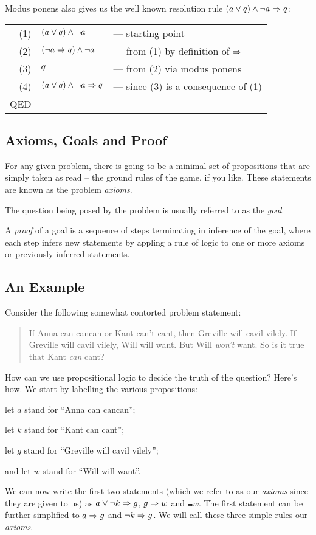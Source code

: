 Modus ponens also gives us the well known resolution rule
$(a \vee q) \wedge \neg{}a \Rightarrow q$:
\begin{tabular}{rll}
(1) & $(a \vee q) \wedge \neg{}a$
& --- starting point \\
(2) & $(\neg{}a \Rightarrow q) \wedge \neg{}a$
& --- from (1) by definition of $\Rightarrow$ \\
(3) & $q$
& --- from (2) via modus ponens \\
(4) & $(a \vee q) \wedge \neg{}a \Rightarrow q$
& --- since (3) is a consequence of (1) \\
QED \\
\end{tabular}

\subsection{Axioms, Goals and Proof}

For any given problem, there is going to be a minimal set of
propositions that are simply taken as read -- the ground rules of the
game, if you like.  These statements are known as the problem
\emph{axioms}.

The question being posed by the problem is usually referred to as the
\emph{goal}.

A \emph{proof} of a goal is a sequence of steps terminating in inference
of the goal, where each step infers new statements by appling a rule of
logic to one or more axioms or previously inferred statements.

\subsection{An Example}


Consider the following somewhat contorted problem statement:
\begin{quote}
If Anna can cancan or Kant can't cant, then Greville will cavil vilely.
If Greville will cavil vilely, Will will want.  But
Will \emph{won't} want.  So is it true that Kant \emph{can} cant?
\end{quote}
How can we use propositional logic to decide the truth of the question?
Here's how.  We start by labelling the various propositions:
\begin{description}
\item let $a$ stand for ``Anna can cancan'';
\item let $k$ stand for ``Kant can cant'';
\item let $g$ stand for ``Greville will cavil vilely'';
\item and let $w$ stand for ``Will will want''.
\end{description}
We can now write the first two statements (which we refer to as our
\emph{axioms} since they are given to us) as $a \vee \neg{}k \Rightarrow g$,
$g \Rightarrow w$ and $\Not{w}$.  The first statement can be further simplified to
$a \Rightarrow g$ and $\neg{}k \Rightarrow g$.  We will call these three simple rules our
\emph{axioms}.


